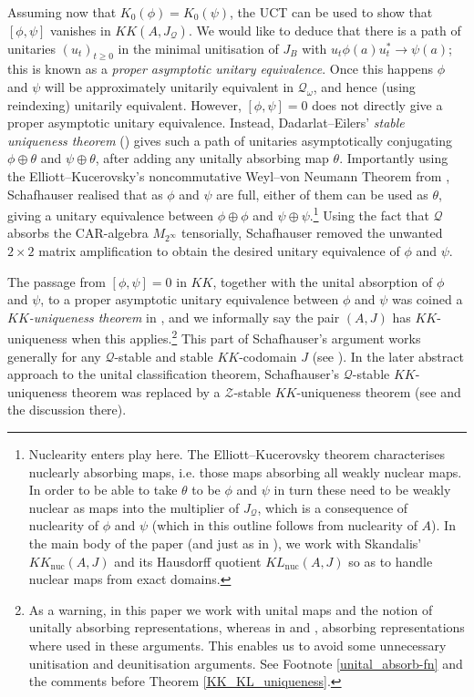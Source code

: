 \documentclass[reqno]{amsart}
\theoremstyle{definition}
\theoremstyle{remark}
\numberwithin{equation}{section}
\theoremstyle{definition}
\newcommand{\calQ}{\mathcal{Q}}
\begin{document}
Assuming now that $K_0(\phi)=K_0(\psi)$, the UCT can be used to show that $[\phi,\psi]$ vanishes in $KK(A,J_\calQ)$.  We would like to deduce that there is a path of unitaries $(u_t)_{t\geq 0}$ in the minimal unitisation of $J_B$ with $u_t\phi(a)u_t^*\to \psi(a)$; this is known as a \emph{proper asymptotic unitary equivalence}. Once this happens $\phi$ and $\psi$ will be approximately unitarily equivalent in $\mathcal Q_\omega$, and hence (using reindexing) unitarily equivalent.  However, $[\phi,\psi]=0$ does not directly give a proper asymptotic unitary equivalence.  Instead, Dadarlat--Eilers' \emph{stable uniqueness theorem} (\cite{Dadarlet-Eilers}) gives such a path of unitaries asymptotically conjugating $\phi\oplus\theta$ and $\psi\oplus\theta$, after adding any unitally absorbing map $\theta$. Importantly using the Elliott--Kucerovsky's noncommutative Weyl--von Neumann Theorem from \cite{EK.PJM}, Schafhauser realised that as $\phi$ and $\psi$ are full, either of them can be used as $\theta$, giving a unitary equivalence between $\phi\oplus\phi$ and $\psi\oplus\psi$.\footnote{Nuclearity enters play here. The Elliott--Kucerovsky theorem characterises nuclearly absorbing maps, i.e. those maps absorbing all weakly nuclear maps. In order to be able to take $\theta$ to be $\phi$ and $\psi$ in turn these need to be weakly nuclear as maps into the multiplier of $J_{\mathcal Q}$, which is a consequence of nuclearity of $\phi$ and $\psi$ (which in this outline follows from nuclearity of $A$). In the main body of the paper (and just as in \cite{Schafhauser.Annals}), we work with Skandalis' $KK_{\mathrm{nuc}}(A,J)$ and its Hausdorff quotient $KL_{\mathrm{nuc}}(A,J)$ so as to handle nuclear maps from exact domains.}  Using the fact that $\mathcal Q$ absorbs the CAR-algebra $M_{2^\infty}$ tensorially, Schafhauser removed the unwanted $2\times 2$ matrix amplification to obtain the desired unitary equivalence of $\phi$ and $\psi$. 

The passage from $[\phi,\psi]=0$ in $KK$, together with the unital absorption of $\phi$ and $\psi$, to a proper asymptotic unitary equivalence between $\phi$ and $\psi$ was coined a \emph{$KK$-uniqueness theorem} in \cite{CGSTW}, and we informally say the pair $(A,J)$ has $KK$-uniqueness when this applies.\footnote{As a warning, in this paper we work with unital maps and the notion of unitally absorbing representations, whereas in \cite{Schafhauser.Annals} and \cite{CGSTW}, absorbing representations where used in these arguments. This enables us to avoid some unnecessary unitisation and deunitisation arguments. See Footnote \ref{unital_absorb-fn} and the comments before Theorem \ref{KK_KL_uniqueness}.} This part of Schafhauser's argument works generally for any $\mathcal Q$-stable and stable $KK$-codomain $J$ (see \cite[Proposition 2.7]{Schafhauser.Annals}). In the later abstract approach to the unital classification theorem, Schafhauser's $\mathcal Q$-stable $KK$-uniqueness theorem was replaced by a $\mathcal Z$-stable $KK$-uniqueness theorem (see \cite[Theorem 1.4]{CGSTW} and the discussion there). 
\end{document}
